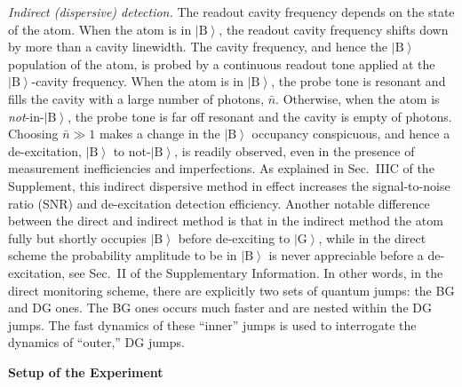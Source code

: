\documentclass[
	 			preprint,     		superscriptaddress, 																longbibliography,
		amsmath, amssymb,
		aps,  prb,   		floatfix,
		linenumbers     
	]{revtex4-1}
\newcommand{\ket}[1]{\left|#1\right>}
\begin{document}
\textit{Indirect (dispersive) detection.}
The readout cavity frequency depends on the state of the atom. 
When the atom is in $\ket{\mathrm{B}}$, the readout cavity frequency shifts down by more than a cavity linewidth. 
The cavity frequency, and hence the $\ket{\mathrm{B}}$ population of the atom, is probed by a continuous readout tone applied at the $\ket{\mathrm{B}}$-cavity frequency. 
When the atom is in $\ket{\mathrm{B}}$, the probe tone is resonant and fills the cavity with a large number of photons, $\bar{n}$. Otherwise, when the atom is \textit{not}-in-$\ket{\mathrm{B}}$, the probe tone is far off resonant and the cavity is empty of photons. 
Choosing $\bar{n}\gg1$ makes a change in the $\ket{\mathrm{B}}$ occupancy conspicuous, and hence a de-excitation, $\ket{\mathrm{B}}$ to not-$\ket{\mathrm{B}}$, is readily observed, even in the presence of measurement inefficiencies and imperfections.
As explained in Sec.~IIIC of the Supplement, this indirect dispersive method in effect increases the signal-to-noise ratio (SNR) and de-excitation detection efficiency. 
Another notable difference between the direct and indirect method is that in the indirect method the atom fully but shortly occupies  $\ket{\mathrm{B}}$  before de-exciting to  $\ket{\mathrm{G}}$, while in the direct scheme the  probability amplitude to be in $\ket{\mathrm{B}}$  is never appreciable before a de-excitation, see Sec.~II of the Supplementary Information.
In other words, in the direct monitoring scheme, there are explicitly two sets of quantum jumps: the BG and DG ones. The BG ones occurs much faster and are nested within the DG jumps. The fast dynamics of these ``inner'' jumps is used to interrogate the dynamics of ``outer,'' DG jumps. 





































\textbf{Setup of the Experiment}
\end{document}
